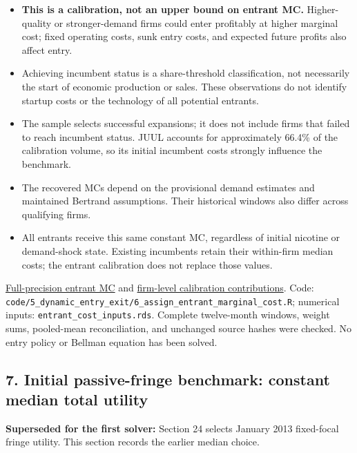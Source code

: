 \documentclass[10pt,]{article}
\providecommand{\tightlist}{%
  \setlength{\itemsep}{0pt}\setlength{\parskip}{0pt}}
\begin{document}
\begin{itemize}
\tightlist
\item
  \textbf{This is a calibration, not an upper bound on entrant MC.}
  Higher-quality or stronger-demand firms could enter profitably at
  higher marginal cost; fixed operating costs, sunk entry costs, and
  expected future profits also affect entry.
\item
  Achieving incumbent status is a share-threshold classification, not
  necessarily the start of economic production or sales. These
  observations do not identify startup costs or the technology of all
  potential entrants.
\item
  The sample selects successful expansions; it does not include firms
  that failed to reach incumbent status. JUUL accounts for approximately
  66.4\% of the calibration volume, so its initial incumbent costs
  strongly influence the benchmark.
\item
  The recovered MCs depend on the provisional demand estimates and
  maintained Bertrand assumptions. Their historical windows also differ
  across qualifying firms.
\item
  All entrants receive this same constant MC, regardless of initial
  nicotine or demand-shock state. Existing incumbents retain their
  within-firm median costs; the entrant calibration does not replace
  those values.
\end{itemize}

\href{../../output/dynamic_entry_exit/constant_marginal_costs_2026-11-03/entrant_constant_marginal_cost.csv}{Full-precision
entrant MC} and
\href{../../output/dynamic_entry_exit/constant_marginal_costs_2026-11-03/entrant_calibration_by_firm.csv}{firm-level
calibration contributions}. Code:
\texttt{code/5\_dynamic\_entry\_exit/6\_assign\_entrant\_marginal\_cost.R};
numerical inputs: \texttt{entrant\_cost\_inputs.rds}. Complete
twelve-month windows, weight sums, pooled-mean reconciliation, and
unchanged source hashes were checked. No entry policy or Bellman
equation has been solved.

\subsection{7. Initial passive-fringe benchmark: constant median total
utility}\label{initial-passive-fringe-benchmark-constant-median-total-utility}

\textbf{Superseded for the first solver:} Section 24 selects January
2013 fixed-focal fringe utility. This section records the earlier median
choice.
\end{document}
